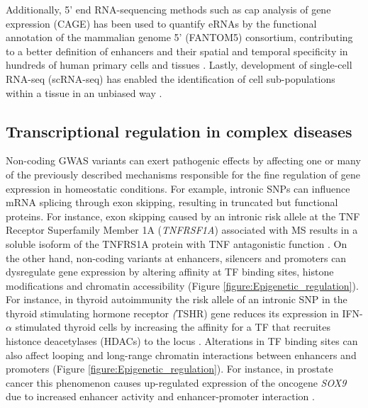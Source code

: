 Additionally, 5’ end RNA-sequencing methods such as cap analysis of gene expression (CAGE) has been used to quantify eRNAs by the functional annotation of the mammalian genome 5' (FANTOM5) consortium, contributing to a better definition of enhancers and their spatial and temporal specificity in hundreds of human primary cells and tissues \parencite{FANTOM2014,Andersson2014}. 
Lastly, development of single-cell RNA-seq (scRNA-seq) has enabled the identification of cell sub-populations within a tissue in an unbiased way \parencite{Tang2009, Tang2010}. 


\subsection{Transcriptional regulation in complex diseases}

Non-coding GWAS variants can exert pathogenic effects by affecting one or many of the previously described mechanisms responsible for the fine regulation of gene expression in homeostatic conditions. For example, intronic SNPs can influence mRNA splicing through exon skipping, resulting in truncated but functional proteins. For instance, exon skipping caused by an intronic risk allele at the TNF Receptor Superfamily Member 1A (\textit{TNFRSF1A}) associated with MS results in a soluble isoform of the TNFRS1A protein with TNF antagonistic function \parencite{Gregory2012}. On the other hand, non-coding variants at enhancers, silencers and promoters can dysregulate gene expression by altering affinity at TF binding sites, histone modifications and chromatin accessibility (Figure \ref{figure:Epigenetic_regulation}). For instance, in thyroid autoimmunity the risk allele of an intronic SNP in the thyroid stimulating hormone receptor \textit(TSHR) gene reduces its expression in IFN-$\alpha$ stimulated thyroid cells by increasing the affinity for a TF that recruites histonce deacetylases (HDACs) to the locus \parencite{Stefan2014}. %
Alterations in TF binding sites can also affect looping and long-range chromatin interactions between enhancers and promoters (Figure \ref{figure:Epigenetic_regulation}). For instance, in prostate cancer this phenomenon causes up-regulated expression of the oncogene \textit{SOX9} due to increased enhancer activity and enhancer-promoter interaction \parencite{Zhang2012}. 

